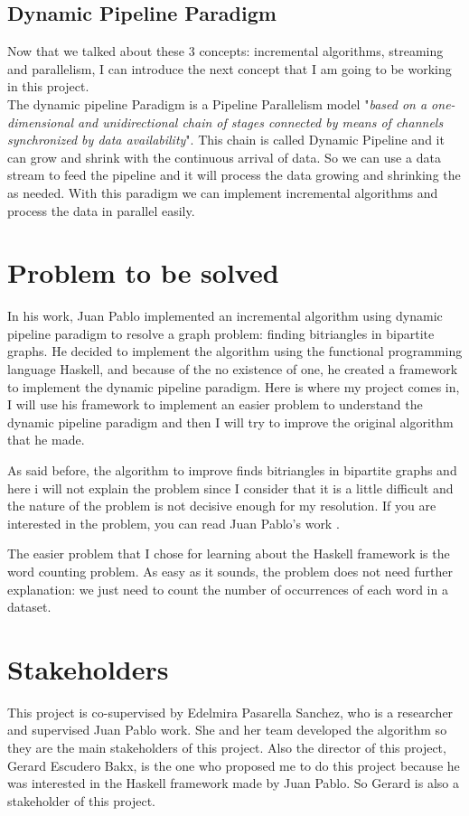 \subsection*{Dynamic Pipeline Paradigm}
Now that we talked about these 3 concepts: incremental algorithms, streaming and parallelism, I can introduce the next concept that I am going to be working in this project. \\
The dynamic pipeline Paradigm is a Pipeline Parallelism model "\textit{based on a one-dimensional and unidirectional chain of stages connected by means of channels synchronized by data availability}". \cite*[][Page 9, 2.2]{juan_pablo_royo_sales_incremental_2021}
This chain is called Dynamic Pipeline and it can grow and shrink with the continuous arrival of data.
So we can use a data stream to feed the pipeline and it will process the data growing and shrinking the as needed.
With this paradigm we can implement incremental algorithms and process the data in parallel easily.
\section{Problem to be solved}
In his work, Juan Pablo implemented an incremental algorithm using dynamic pipeline paradigm to resolve a graph problem: finding bitriangles in bipartite graphs.
He decided to implement the algorithm using the functional programming language Haskell, and because of the no existence of one, he created a framework to implement the dynamic pipeline paradigm.
Here is where my project comes in, I will use his framework to implement an easier problem to understand the dynamic pipeline paradigm and then I will try to improve the original algorithm that he made.

As said before, the algorithm to improve finds bitriangles in bipartite graphs and here i will not explain the problem since I consider that it is a little difficult and the nature of the problem is not decisive enough for my resolution.
If you are interested in the problem, you can read Juan Pablo's work \cite[][Page 5, 1.1]{juan_pablo_royo_sales_incremental_2021}.

The easier problem that I chose for learning about the Haskell framework is the word counting problem.
As easy as it sounds, the problem does not need further explanation: we just need to count the number of occurrences of each word in a dataset.
\section{Stakeholders}
This project is co-supervised by Edelmira Pasarella Sanchez, who is a researcher and supervised Juan Pablo work.
She and her team developed the algorithm so they are the main stakeholders of this project.
Also the director of this project, Gerard Escudero Bakx, is the one who proposed me to do this project because he was interested in the Haskell framework made by Juan Pablo.
So Gerard is also a stakeholder of this project.

